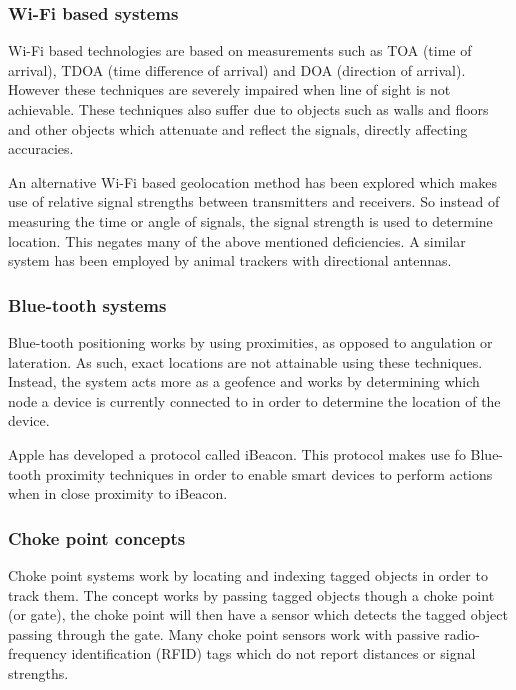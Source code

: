 \documentclass[11pt,a4paper]{article}
\begin{document}
	\subsubsection{Wi-Fi based systems}
		Wi-Fi based technologies are based on measurements such as TOA (time of arrival), TDOA (time difference of arrival) and DOA (direction of arrival). However these techniques are severely impaired when line of sight is not achievable. These techniques also suffer due to objects such as walls and floors and other objects which attenuate and reflect the signals, directly affecting accuracies.
	
		An alternative Wi-Fi based geolocation method has been explored which makes use of relative signal strengths between transmitters and receivers. So instead of measuring the time or angle of signals, the signal strength is used to determine location. This negates many of the above mentioned deficiencies. A similar system has been employed by animal trackers with directional antennas.
		\cite{yongguang_chen_signal_2002}
	
	\subsubsection{Blue-tooth systems}
		Blue-tooth positioning works by using proximities, as opposed to angulation or lateration. As such, exact locations are not attainable using these techniques. Instead, the system acts more as a geofence and works by determining which node a device is currently connected to in order to determine the location of the device.
	
		Apple has developed a protocol called iBeacon. This protocol makes use fo Blue-tooth proximity techniques in order to enable smart devices to perform actions when in close proximity to iBeacon.
		\cite{_everything_????}
	
	\subsubsection{Choke point concepts}
		Choke point systems work by locating and indexing tagged objects in order to track them. The concept works by passing tagged objects though a choke point (or gate), the choke point will then have a sensor which detects the tagged object passing through the gate. Many choke point sensors work with passive radio-frequency identification (RFID) tags which do not report distances or signal strengths.
		\cite{reza_investigation_2008}
	
\end{document}
